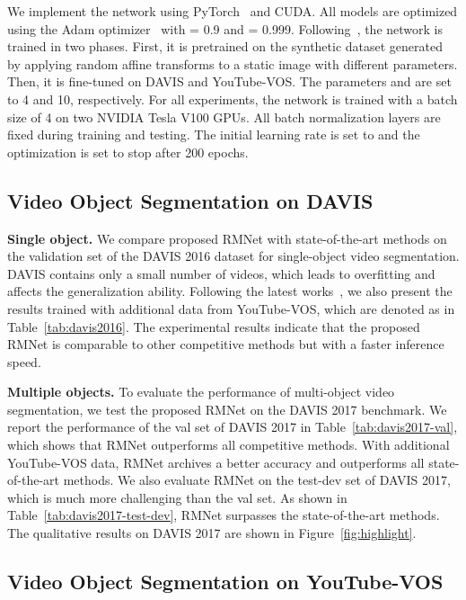 \documentclass[final]{cvpr}
\begin{document}
We implement the network using PyTorch~\cite{DBLP:conf/nips/AdamSSGEZZALA19} and CUDA.
All models are optimized using the Adam optimizer~\cite{DBLP:conf/iclr/KingmaB15} with  = 0.9 and  = 0.999.
Following~\cite{DBLP:conf/iccv/OhLXK19,DBLP:conf/eccv/SeongHK20}, the network is trained in two phases.
First, it is pretrained on the synthetic dataset generated by applying random affine transforms to a static image with different parameters.
Then, it is fine-tuned on DAVIS and YouTube-VOS. 
The parameters  and  are set to 4 and 10, respectively. 
For all experiments, the network is trained with a batch size of 4 on two NVIDIA Tesla V100 GPUs.
All batch normalization layers are fixed during training and testing.
The initial learning rate is set to  and the optimization is set to stop after 200 epochs.

\subsection{Video Object Segmentation on DAVIS}

\noindent \textbf{Single object.}
We compare proposed RMNet  with state-of-the-art methods on the validation set of the DAVIS 2016 dataset for single-object video segmentation.
DAVIS contains only a small number of videos, which leads to overfitting and affects the generalization ability.
Following the latest works~\cite{DBLP:conf/cvpr/ChengTHW018,DBLP:conf/iccv/OhLXK19,DBLP:conf/eccv/SeongHK20,DBLP:conf/eccv/YangWY20}, we also present the results trained with additional data from YouTube-VOS, which are denoted as  in Table~\ref{tab:davis2016}.
The experimental results indicate that the proposed RMNet is comparable to other competitive methods but with a faster inference speed.

\noindent \textbf{Multiple objects.}
To evaluate the performance of multi-object video segmentation, we test the proposed RMNet on the DAVIS 2017 benchmark.
We report the performance of the val set of DAVIS 2017 in Table~\ref{tab:davis2017-val}, which shows that RMNet outperforms all competitive methods.
With additional YouTube-VOS data, RMNet archives a better accuracy and outperforms all state-of-the-art methods.
We also evaluate RMNet on the test-dev set of DAVIS 2017, which is much more challenging than the val set.
As shown in Table~\ref{tab:davis2017-test-dev}, RMNet surpasses the state-of-the-art methods.
The qualitative results on DAVIS 2017 are shown in Figure~\ref{fig:highlight}.

\subsection{Video Object Segmentation on YouTube-VOS}
\end{document}
